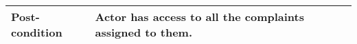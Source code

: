 \begin{table}[]
\begin{tabular}{|l|p{5cm}p{5cm}|}
        {\color[HTML]{231F20} \textbf{Post-condition}}                                                  & \multicolumn{2}{l|}{{\color[HTML]{231F20} Actor   has access to all the complaints assigned to them.}}                                                                                                                                                                                                              \\ \hline
    \end{tabular}
\end{table}